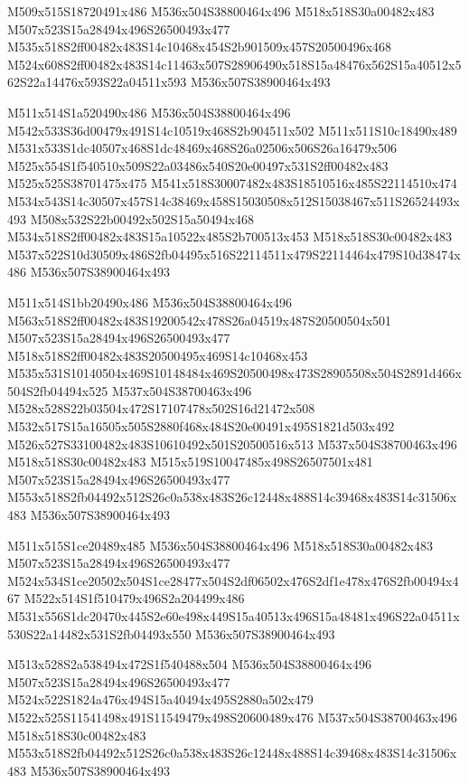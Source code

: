 \documentclass{article}
\begin{document}
\begin{multicols}{5}
\begin{center}

M509x515S18720491x486 %
M536x504S38800464x496 %
M518x518S30a00482x483 %
M507x523S15a28494x496S26500493x477 %
M535x518S2ff00482x483S14c10468x454S2b901509x457S20500496x468 %
M524x608S2ff00482x483S14c11463x507S28906490x518S15a48476x562S15a40512x562S22a14476x593S22a04511x593 %
M536x507S38900464x493 %
\vfil
\columnbreak

M511x514S1a520490x486 %
M536x504S38800464x496 %
M542x533S36d00479x491S14c10519x468S2b904511x502 %
M511x511S10c18490x489 %
M531x533S1dc40507x468S1dc48469x468S26a02506x506S26a16479x506 %
M525x554S1f540510x509S22a03486x540S20e00497x531S2ff00482x483 %
M525x525S38701475x475 %
M541x518S30007482x483S18510516x485S22114510x474 %
M534x543S14c30507x457S14c38469x458S15030508x512S15038467x511S26524493x493 %
M508x532S22b00492x502S15a50494x468 %
M534x518S2ff00482x483S15a10522x485S2b700513x453 %
M518x518S30c00482x483 %
M537x522S10d30509x486S2fb04495x516S22114511x479S22114464x479S10d38474x486 %
M536x507S38900464x493 %
\vfil
\columnbreak

M511x514S1bb20490x486 %
M536x504S38800464x496 %
M563x518S2ff00482x483S19200542x478S26a04519x487S20500504x501 %
M507x523S15a28494x496S26500493x477 %
M518x518S2ff00482x483S20500495x469S14c10468x453 %
M535x531S10140504x469S10148484x469S20500498x473S28905508x504S2891d466x504S2fb04494x525 %
M537x504S38700463x496 %
M528x528S22b03504x472S17107478x502S16d21472x508 %
M532x517S15a16505x505S2880f468x484S20e00491x495S1821d503x492 %
M526x527S33100482x483S10610492x501S20500516x513 %
M537x504S38700463x496 %
M518x518S30c00482x483 %
M515x519S10047485x498S26507501x481 %
M507x523S15a28494x496S26500493x477 %
M553x518S2fb04492x512S26c0a538x483S26c12448x488S14c39468x483S14c31506x483 %
M536x507S38900464x493 %
\vfil
\columnbreak

M511x515S1ce20489x485 %
M536x504S38800464x496 %
M518x518S30a00482x483 %
M507x523S15a28494x496S26500493x477 %
M524x534S1ce20502x504S1ce28477x504S2df06502x476S2df1e478x476S2fb00494x467 %
M522x514S1f510479x496S2a204499x486 %
M531x556S1dc20470x445S2e60e498x449S15a40513x496S15a48481x496S22a04511x530S22a14482x531S2fb04493x550 %
M536x507S38900464x493 %
\vfil
\columnbreak

M513x528S2a538494x472S1f540488x504 %
M536x504S38800464x496 %
M507x523S15a28494x496S26500493x477 %
M524x522S1824a476x494S15a40494x495S2880a502x479 %
M522x525S11541498x491S11549479x498S20600489x476 %
M537x504S38700463x496 %
M518x518S30c00482x483 %
M553x518S2fb04492x512S26c0a538x483S26c12448x488S14c39468x483S14c31506x483 %
M536x507S38900464x493 %
\vfil

\end{center}
\end{multicols}
\end{document}
